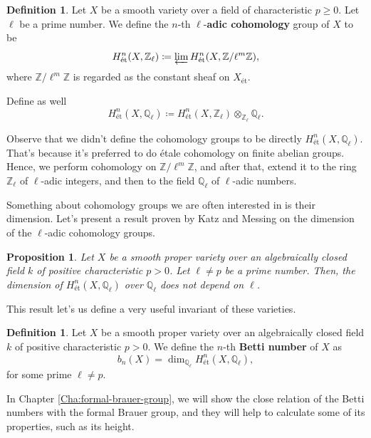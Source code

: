 \documentclass{report}
\newtheorem{proposition}[equation]{Proposition}
\theoremstyle{definition}
\newtheorem{definition}[equation]{Definition}
\begin{document}
\begin{definition}
Let $X$ be a smooth variety over a field of characteristic $p\geq0$. Let $\ell$ be a prime number. We define the $n$-th $\ell$-\textbf{adic cohomology} group of $X$ to be
\[H_{\text{\'{e}t}}^n(X,\mathbb{Z}_{\ell})\coloneqq\varprojlim H_{\text{\'{e}t}}^n(X,\mathbb{Z}/\ell^m\mathbb{Z}),\]
where $\mathbb{Z}/\ell^m\mathbb{Z}$ is regarded as the constant sheaf on $X_{\text{\'{e}t}}$.

Define as well
\[H_{\text{\'{e}t}}^n(X,\mathbb{Q}_{\ell})\coloneqq H_{\text{\'{e}t}}^n(X,\mathbb{Z}_{\ell})\otimes_{\mathbb{Z}_{\ell}}\mathbb{Q}_{\ell}.\]
\end{definition}

Observe that we didn't define the cohomology groups to be directly $H_{\text{\'{e}t}}^n(X,\mathbb{Q}_{\ell})$. That's because it's preferred to do \'{e}tale cohomology on finite abelian groups. Hence, we perform cohomology on $\mathbb{Z}/\ell^m\mathbb{Z}$, and after that, extend it to the ring $\mathbb{Z}_{\ell}$ of $\ell$-adic integers, and then to the field $\mathbb{Q}_{\ell}$ of $\ell$-adic numbers.

Something about cohomology groups we are often interested in is their dimension. Let's present a result proven by Katz and Messing \cite[Corollary~1]{katz1974consequences} on the dimension of the $\ell$-adic cohomology groups.

\begin{proposition}
Let $X$ be a smooth proper variety over an algebraically closed field $k$ of positive characteristic $p>0$. Let $\ell\neq p$ be a prime number. Then, the dimension of $H_{\text{\'{e}t}}^n(X,\mathbb{Q}_{\ell})$ over $\mathbb{Q}_{\ell}$ does not depend on $\ell$.
\end{proposition}

This result let's us define a very useful invariant of these varieties.

\begin{definition}
\label{def:betti-numbers}
Let $X$ be a smooth proper variety over an algebraically closed field $k$ of positive characteristic $p>0$. We define the $n$-th \textbf{Betti number} of $X$ as
\[b_n(X)=\dim_{\mathbb{Q}_{\ell}}H_{\text{\'{e}t}}^n(X,\mathbb{Q}_{\ell}),\]
for some prime $\ell\neq p$.
\end{definition}

In Chapter \ref{Cha:formal-brauer-group}, we will show the close relation of the Betti numbers with the formal Brauer group, and they will help to calculate some of its properties, such as its height.
\end{document}
